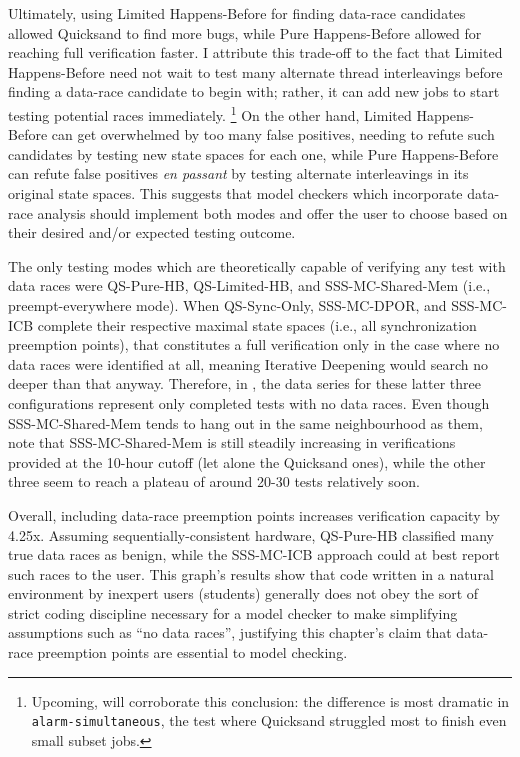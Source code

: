 Ultimately, using Limited Happens-Before for finding data-race candidates allowed Quicksand to find more bugs,
while Pure Happens-Before allowed for reaching full verification faster.
I attribute this trade-off to the fact that
Limited Happens-Before need not wait to test many alternate thread interleavings before
finding a data-race candidate to begin with;
rather, it can add new jobs to start testing potential races immediately.%
\footnote{Upcoming,  will corroborate this conclusion:
the difference is most dramatic in {\tt alarm-\allowbreak{}simultaneous},
the test where Quicksand struggled most to finish even small subset jobs.}
%
On the other hand, Limited Happens-Before can get overwhelmed by too many false positives,
needing to refute such candidates by testing new state spaces for each one,
while Pure Happens-Before can refute false positives {\em en passant}
by testing alternate interleavings in its original state spaces.
This suggests that
model checkers which incorporate data-race analysis should implement both modes
and offer the user to choose based on their desired and/or expected testing outcome.

The only testing modes which are theoretically capable of verifying any test with data races
were QS-Pure-HB, QS-Limited-HB, and SSS-MC-Shared-Mem (i.e., preempt-everywhere mode).
When QS-Sync-Only, SSS-MC-DPOR, and SSS-MC-ICB
complete their respective maximal state spaces (i.e., all synchronization preemption points),
that constitutes a full verification only in the case where no data races were identified at all,
meaning Iterative Deepening would search no deeper than that anyway.
Therefore, in ,
the data series for these latter three configurations
represent only completed tests with no data races.
Even though SSS-MC-Shared-Mem tends to hang out in the same neighbourhood as them,
note that SSS-MC-Shared-Mem is still steadily increasing in verifications provided at the 10-hour cutoff
(let alone the Quicksand ones),
while the other three seem to reach a plateau of around 20-30 tests relatively soon.

Overall, including data-race preemption points increases verification capacity by 4.25x.
Assuming sequentially-consistent hardware,
QS-Pure-HB classified many true data races as benign,
while the SSS-MC-ICB approach could at best report such races to the user.
This graph's results show that code written in a natural environment by inexpert users (students)
generally does not obey the sort of strict coding discipline necessary
for a model checker to make simplifying assumptions such as ``no data races'',
justifying this chapter's claim that data-race preemption points are essential to model checking.

